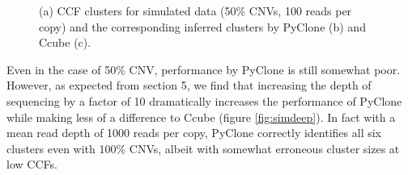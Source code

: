 \documentclass{article}
\begin{document}
\begin{figure}[h]
\begin{subfigure}[t]{0.32\linewidth}
		\subcaption{}
	\end{subfigure}%
\caption{(a) CCF clusters for simulated data (50\% CNVs, 100 reads per copy) and the corresponding inferred clusters by PyClone (b) and Ccube (c).}
\label{fig:sim70}
\end{figure}


Even in the case of 50\% CNV, performance by PyClone is still somewhat poor. However, as expected from section 5, we find that increasing the depth of sequencing by a factor of 10 dramatically increases the performance of PyClone while making less of a difference to Ccube (figure \ref{fig:simdeep}). In fact with a mean read depth of 1000 reads per copy, PyClone correctly identifies all six clusters even with 100\% CNVs, albeit with somewhat erroneous cluster sizes at low CCFs.
\end{document}
